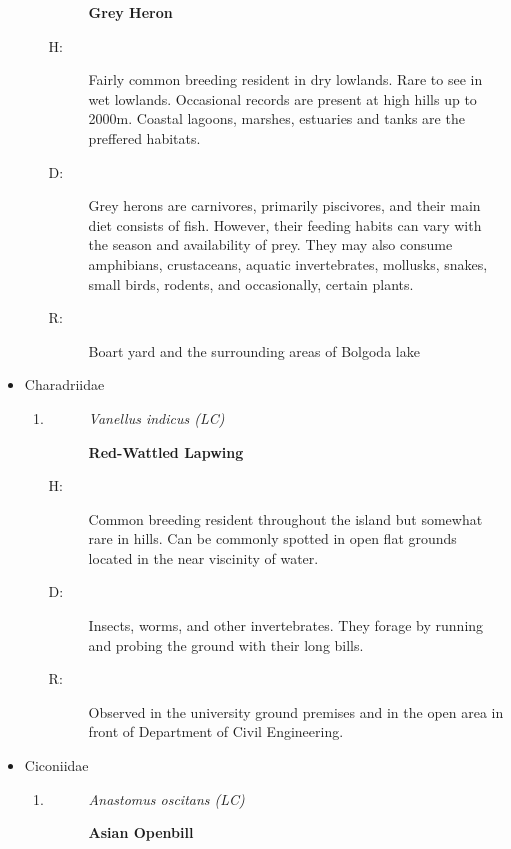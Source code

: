 \begin{itemize}
\begin{enumerate}
\begin{description}
\item[]%
\textbf{Grey Heron}%
\end{description}%
\begin{description}%
\item[H: ]%
Fairly common breeding resident in dry lowlands. Rare to see in wet lowlands. Occasional records are present at high hills up to 2000m. Coastal lagoons, marshes, estuaries and tanks are the preffered habitats.%
\item[D: ]%
Grey herons are carnivores, primarily piscivores, and their main diet consists of fish. However, their feeding habits can vary with the season and availability of prey. They may also consume amphibians, crustaceans, aquatic invertebrates, mollusks, snakes, small birds, rodents, and occasionally, certain plants.%
\item[R: ]%
Boart yard and the surrounding areas of Bolgoda lake%
\end{description}%
\end{enumerate}%
\item%
Charadriidae%
\begin{enumerate}%
\item%
\begin{description}%
\item[]%
\textit{Vanellus indicus (LC)}%
\item[]%
\textbf{Red{-}Wattled Lapwing}%
\end{description}%
\begin{description}%
\item[H: ]%
Common breeding resident throughout the island but somewhat rare in hills. Can be commonly spotted in open flat grounds located in the near viscinity of water.%
\item[D: ]%
Insects, worms, and other invertebrates. They forage by running and probing the ground with their long bills.%
\item[R: ]%
Observed in the university ground premises and in the open area in front of Department of Civil Engineering.%
\end{description}%
\end{enumerate}%
\item%
Ciconiidae%
\begin{enumerate}%
\item%
\begin{description}%
\item[]%
\textit{Anastomus oscitans (LC)}%
\item[]%
\textbf{Asian Openbill}%
\end{description}%

\end{enumerate}
\end{itemize}
